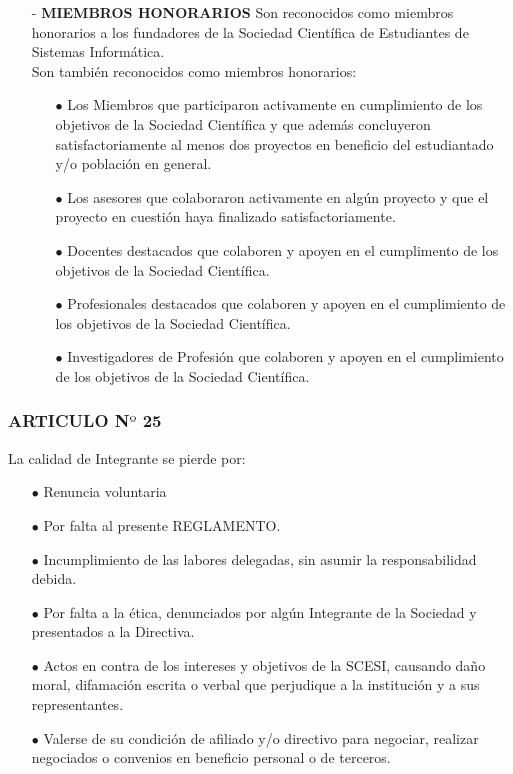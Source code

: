 \documentclass[letterpaper,11pt]{book}
\begin{document}
\begin{itemize}
\item[-] {\bf MIEMBROS HONORARIOS}
Son reconocidos como miembros honorarios a los fundadores de la Sociedad Científica de Estudiantes de Sistemas Informática.\\
Son también reconocidos como miembros honorarios:
\begin{itemize}
\item[$\bullet$] Los Miembros que participaron activamente en cumplimiento de los objetivos de la Sociedad Científica y que además concluyeron satisfactoriamente al menos dos proyectos en beneficio del estudiantado y/o población en general.
\item[$\bullet$] Los asesores que colaboraron activamente en algún proyecto y que el proyecto en	cuestión haya finalizado satisfactoriamente.
\item[$\bullet$] Docentes destacados que colaboren y apoyen en el cumplimento de los objetivos de la Sociedad Científica.
\item[$\bullet$] Profesionales destacados que colaboren y apoyen en el cumplimiento de los objetivos de la Sociedad Científica.
\item[$\bullet$] Investigadores de Profesión que colaboren y apoyen en el cumplimiento de los objetivos de la Sociedad Científica.
\end{itemize}
\end{itemize}
\subsubsection*{ARTICULO N$º$ 25}
La calidad de Integrante se pierde por:
\begin{itemize}
\item[$\bullet$] Renuncia voluntaria 
\item[$\bullet$] Por falta al presente REGLAMENTO. 
\item[$\bullet$] Incumplimiento de las labores delegadas, sin asumir la responsabilidad debida. 
\item[$\bullet$] Por falta a la ética, denunciados por algún Integrante de la Sociedad y presentados a la Directiva. 
\item[$\bullet$] Actos en contra de los intereses y objetivos de la SCESI, causando daño moral, difamación escrita o verbal que perjudique a la institución y a sus representantes. 
\item[$\bullet$]Valerse de su condición de afiliado y/o directivo para negociar, realizar negociados o convenios en beneficio personal o de terceros. 
\end{itemize}
\newpage
\end{document}
